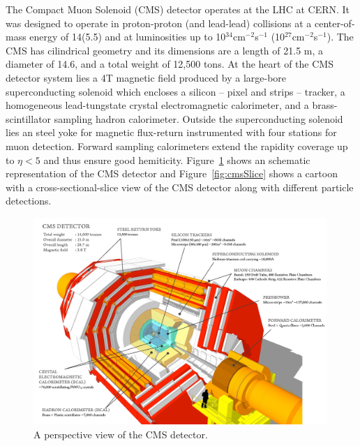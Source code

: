 The Compact Muon Solenoid (CMS) detector operates at the LHC at CERN. It was designed to operate in proton-proton (and lead-lead)
collisions at a center-of-mass energy of 14\TeV (5.5\TeV) and at
luminosities up to 10$^{34}$cm$^{-2}$s$^{-1}$
(10$^{27}$cm$^{-2}$s$^{-1}$). The CMS has cilindrical geometry and
its dimensions are a length of 21.5 m, a diameter of 14.6, and a total
weight of 12,500 tons. At the heart of the CMS detector system
lies a 4\unit{T} magnetic field produced by a large-bore superconducting
solenoid which encloses a silicon -- pixel and strips -- tracker, a homogeneous
lead-tungstate crystal electromagnetic calorimeter, and a brass-scintillator
sampling hadron calorimeter. Outside the superconducting solenoid lies
an steel yoke for magnetic flux-return instrumented with four stations
for muon detection. Forward sampling calorimeters extend the rapidity
coverage up to $\eta < 5$ and thus ensure good
hemiticity. Figure~\ref{fig:cmsDetector} shows an schematic representation
of the CMS detector and Figure~\ref{fig:cmsSlice} shows a cartoon
with a cross-sectional-slice view of the CMS detector along with
different particle detections.
\begin{figure}
 \centering
\includegraphics[width=0.99\textwidth]{CMS_DetectorFigures/cms_detector.png}
 \caption{A perspective view of the CMS detector.\label{fig:cmsDetector}}
\end{figure}
